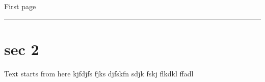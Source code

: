 \documentclass[]{article}
\begin{document}
    First page\newpage
    \rule{\linewidth}{\textheight}
    \section{sec 2}
    Text starts from here kjfdjfs fjks djfskfn sdjk fskj
    \newpage
    flkdkl
    \newpage
    ffadl
\end{document}
